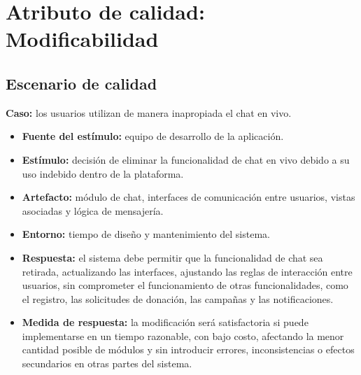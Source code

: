 \section{Atributo de calidad: Modificabilidad}

\subsection{Escenario de calidad}

\textbf{Caso:} los usuarios utilizan de manera inapropiada el chat en vivo.

\begin{itemize}
    \item \textbf{Fuente del estímulo:} equipo de desarrollo de la aplicación.
    \item \textbf{Estímulo:} decisión de eliminar la funcionalidad de chat en vivo debido a su uso indebido dentro de la plataforma.
    \item \textbf{Artefacto:} módulo de chat, interfaces de comunicación entre usuarios, vistas asociadas y lógica de mensajería.
    \item \textbf{Entorno:} tiempo de diseño y mantenimiento del sistema.
    \item \textbf{Respuesta:} el sistema debe permitir que la funcionalidad de chat sea retirada, actualizando las interfaces, ajustando las reglas de interacción entre usuarios, sin comprometer el funcionamiento de otras funcionalidades, como el registro, las solicitudes de donación, las campañas y las notificaciones.
    \item \textbf{Medida de respuesta:} la modificación será satisfactoria si puede implementarse en un tiempo razonable, con bajo costo, afectando la menor cantidad posible de módulos y sin introducir errores, inconsistencias o efectos secundarios en otras partes del sistema.
\end{itemize}

